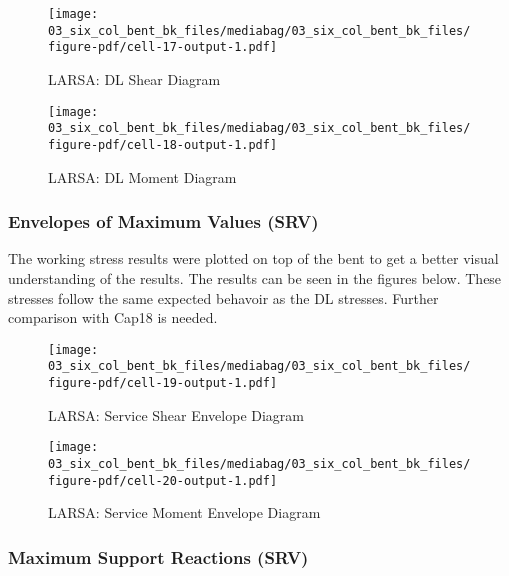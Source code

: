 \documentclass[
  letterpaper,
  DIV=11,
  numbers=noendperiod]{scrartcl}
\begin{document}
\begin{figure}[H]

{\centering \texttt{[image: 03\_six\_col\_bent\_bk\_files/mediabag/03\_six\_col\_bent\_bk\_files/figure-pdf/cell-17-output-1.pdf]}

}

\caption{LARSA: DL Shear Diagram}

\end{figure}%

\begin{figure}[H]

{\centering \texttt{[image: 03\_six\_col\_bent\_bk\_files/mediabag/03\_six\_col\_bent\_bk\_files/figure-pdf/cell-18-output-1.pdf]}

}

\caption{LARSA: DL Moment Diagram}

\end{figure}%

\newpage{}

\subsubsection{Envelopes of Maximum Values
(SRV)}\label{envelopes-of-maximum-values-srv-1}

The working stress results were plotted on top of the bent to get a
better visual understanding of the results. The results can be seen in
the figures below. These stresses follow the same expected behavoir as
the DL stresses. Further comparison with Cap18 is needed.

\begin{figure}[H]

{\centering \texttt{[image: 03\_six\_col\_bent\_bk\_files/mediabag/03\_six\_col\_bent\_bk\_files/figure-pdf/cell-19-output-1.pdf]}

}

\caption{LARSA: Service Shear Envelope Diagram}

\end{figure}%

\begin{figure}[H]

{\centering \texttt{[image: 03\_six\_col\_bent\_bk\_files/mediabag/03\_six\_col\_bent\_bk\_files/figure-pdf/cell-20-output-1.pdf]}

}

\caption{LARSA: Service Moment Envelope Diagram}

\end{figure}%

\subsubsection{Maximum Support Reactions
(SRV)}\label{maximum-support-reactions-srv-1}
\end{document}
